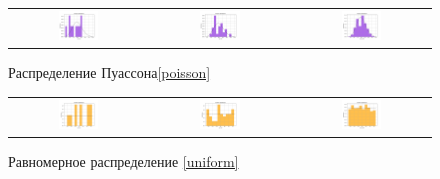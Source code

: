﻿\documentclass[12pt,a4paper]{article}
\begin{document}
\begin{figure}[H]
    \centering
    \begin{tabular}{c c c}
        \includegraphics[height = 0.25\textheight, width = 0.31\textwidth]{Poisson_10.png}
        & \includegraphics[height = 0.25\textheight, width = 0.31\textwidth]{Poisson_50.png}
        & \includegraphics[height = 0.25\textheight, width = 0.31\textwidth]{Poisson_1000.png}
    \end{tabular}
    \caption{Распределение Пуассона\eqref{poisson}}
    \label{fig:poisson}
\end{figure}

\begin{figure}[H]
    \centering
    \begin{tabular}{c c c}
        \includegraphics[height = 0.25\textheight, width = 0.31\textwidth]{Uniform_10.png}
        & \includegraphics[height = 0.25\textheight, width = 0.31\textwidth]{Uniform_50.png}
        & \includegraphics[height = 0.25\textheight, width = 0.31\textwidth]{Uniform_1000.png}
    \end{tabular}
    \caption{Равномерное распределение \eqref{uniform}}
    \label{fig:uniform}
\end{figure}
\end{document}

